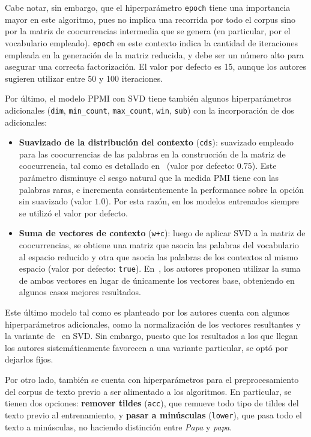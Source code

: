 Cabe notar, sin embargo, que el hiperparámetro \texttt{epoch} tiene una importancia mayor en este
algoritmo, pues no implica una recorrida por todo el corpus sino por la matriz de coocurrencias
intermedia que se genera (en particular, por el vocabulario empleado). \texttt{epoch} en este
contexto indica la cantidad de iteraciones empleada en la generación de la matriz reducida, y debe
ser un número alto para asegurar una correcta factorización. El valor por defecto es 15, aunque los
autores sugieren utilizar entre 50 y 100 iteraciones.

Por último, el modelo PPMI con SVD tiene también algunos hiperparámetros adicionales (\texttt{dim},
\texttt{min\_count}, \texttt{max\_count}, \texttt{win}, \texttt{sub}) con la incorporación de dos
adicionales:

\begin{itemize}

\item \textbf{Suavizado de la distribución del contexto} (\texttt{cds}): suavizado empleado para las
coocurrencias de las palabras en la construcción de la matriz de coocurrencia, tal como es detallado
en~\cite{Levy2015} (valor por defecto: $0.75$). Este parámetro disminuye el sesgo natural que la
medida PMI tiene con las palabras raras, e incrementa consistentemente la performance sobre la
opción sin suavizado (valor $1.0$). Por esta razón, en los modelos entrenados siempre se utilizó el
valor por defecto.

\item \textbf{Suma de vectores de contexto} (\texttt{w+c}): luego de aplicar SVD a la matriz de
coocurrencias, se obtiene una matriz que asocia las palabras del vocabulario al espacio reducido y
otra que asocia las palabras de los contextos al mismo espacio (valor por defecto:
\texttt{true}). En~\cite{Levy2015}, los autores proponen utilizar la suma de ambos vectores en lugar
de únicamente los vectores base, obteniendo en algunos casos mejores resultados.

\end{itemize}

Este último modelo tal como es planteado por los autores cuenta con algunos hiperparámetros
adicionales, como la normalización de los vectores resultantes y la variante de~\cite{Caron2001} en
SVD\@. Sin embargo, puesto que los resultados a los que llegan los autores sistemáticamente
favorecen a una variante particular, se optó por dejarlos fijos.


Por otro lado, también se cuenta con hiperparámetros para el preprocesamiento del corpus de texto
previo a ser alimentado a los algoritmos. En particular, se tienen dos opciones: \textbf{remover
tildes} (\texttt{acc}), que remueve todo tipo de tildes del texto previo al entrenamiento, y
\textbf{pasar a minúsculas} (\texttt{lower}), que pasa todo el texto a minúsculas, no haciendo
distinción entre \textit{Papa} y \textit{papa}.

